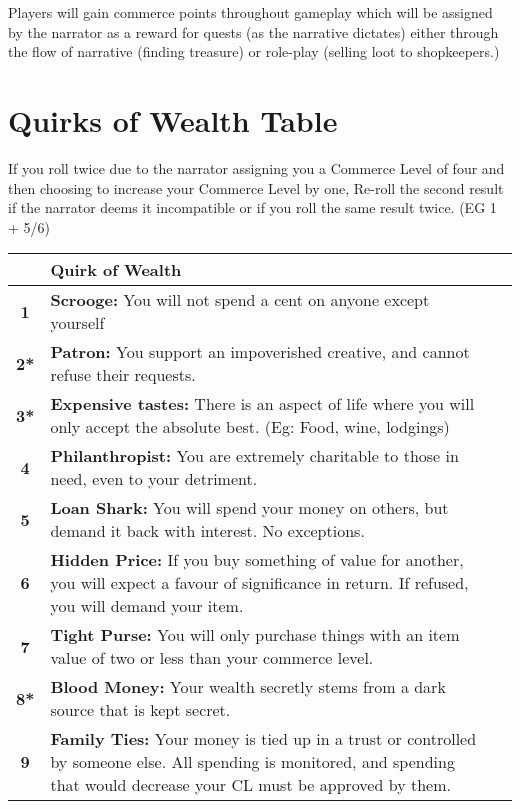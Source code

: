 Players will gain commerce points throughout gameplay which will be assigned by the narrator as a reward for quests (as the narrative dictates) either through the flow of narrative (finding treasure) or role-play (selling loot to shopkeepers.)

\section{Quirks of Wealth Table} \label{sec:quirks_of_wealth_table}

If you roll twice due to the narrator assigning you a Commerce Level of four and then choosing to increase your Commerce Level by one, Re-roll the second result if the narrator deems it incompatible or if you roll the same result twice. (EG 1 + 5/6)

\begin{center}
    \begin{xltabular}{\textwidth}{|c|X|X|} 
     \hline
       & \textbf{Quirk of Wealth} \\ 
     \hline
     \textbf{1} & \textbf{Scrooge:} You will not spend a cent on anyone except yourself \\ 
     \textbf{2*} & \textbf{Patron:} You support an impoverished creative, and cannot refuse their requests. \\
     \textbf{3*} & \textbf{Expensive tastes:} There is an aspect of life where you will only accept the absolute best. (Eg: Food, wine, lodgings) \\
     \textbf{4} & \textbf{Philanthropist:} You are extremely charitable to those in need, even to your detriment. \\
     \textbf{5} & \textbf{Loan Shark:} You will spend your money on others, but demand it back with interest. No exceptions. \\
     \textbf{6} & \textbf{Hidden Price:} If you buy something of value for another, you will expect a favour of significance in return. If refused, you will demand your item. \\
     \textbf{7} & \textbf{Tight Purse:} You will only purchase things with an item value of two or less than your commerce level. \\
     \textbf{8*} & \textbf{Blood Money:} Your wealth secretly stems from a dark source that is kept secret.\\
     \textbf{9} & \textbf{Family Ties:} Your money is tied up in a trust or controlled by someone else. All spending is monitored, and spending that would decrease your CL must be approved by them. \\

\end{xltabular}
\end{center}
